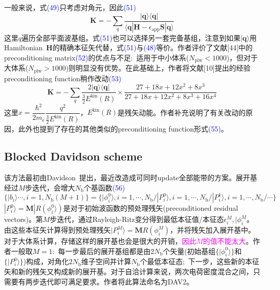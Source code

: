 \documentclass[14pt]{article}      %
\begin{document}
一般来说，式\textcolor{blue}{(49)}只考虑对角元，因此\textcolor{blue}{(51)}
\begin{displaymath}
	\mathbf{K}=-\sum_q\dfrac{|\mathbf{q}\rangle\langle\mathbf{q}|}{\langle\mathbf{q}|\mathbf{H}-\epsilon_{\mathrm{app}}\mathbf{S}|\mathbf{q}\rangle}
\end{displaymath}
这里$q$遍历全部平面波基组。式\textcolor{blue}{(51)}也可以选择另一套完备基组，注意到如果$|\mathbf{q}\rangle$用\textrm{Hamiltonian~}$\mathbf{H}$的精确本征矢代替，式\textcolor{blue}{(51)}与\textcolor{blue}{(48)}等价。作者评价了文献[44]中的\textrm{preconditioning matrix}\textcolor{blue}{(52)}的优点与不足:~适用于中小体系($N_{\mathrm{plw}}<1000$)，但对于大体系($N_{\mathrm{plw}}>1000$)则明显没有优势。在此基础上，作者将文献[10]提出的经验\textrm{preconditioning function}稍作改动\textcolor{blue}{(53)}
\begin{displaymath}
	\mathbf{K}=-\sum_q\dfrac{2|\mathbf{q}\rangle\langle\mathbf{q}|}{\frac32E^{\mathrm{kin}}(R)}\times\dfrac{27+18x+12x^2+8x^3}{27+18x+12x^2+8x^3+16x^4}
\end{displaymath}
这里$x=\dfrac{\hbar^2}{2m_{\mathrm{e}}}\dfrac{q^2}{\frac32E^{\mathrm{kin}}(R)}$，$E^{\mathrm{kin}}(R)$是残矢动能。作者补充说明了有关改动的原因，此外也提到了存在的其他类似的\textrm{preconditioning function}形式\textcolor{blue}{(55)}。

\subsection{Blocked Davidson scheme}
该方法最初由\textrm{Davidson~}提出，最近改造成可同时\textrm{update}全部能带的方案。展开基经过$M$步迭代，会增大$N_{\mathrm{b}}$个基函数\textcolor{blue}{(56)}
\begin{displaymath}
	\{|b_i\rangle\cdots,i=1,N_{\mathrm{b}}(M+1)\}=\{|\phi_i^0\rangle,i=1,\cdots,N_{\mathrm{b}}/|P_i^0\rangle,i=1,\cdots,N_{\mathrm{b}}/|P_i^1\rangle,i=1,\cdots,N_{\mathrm{b}}/\cdots\}
\end{displaymath}
$|P_i^0\rangle=\mathbf{M}|R(\phi_i^0\rangle)$是对于初始波函数的预处理残矢(\textrm{preconditioned residual vectors})。第$M$步迭代，通过\textrm{Rayleigh-Ritz}变分得到最低本征值/本征态$\epsilon_i^M,|\phi_i^M$。由这些本征矢计算得到预处理残矢$|P_i^M\rangle=\mathbf{M}R(\phi_i^M)$，并将残矢加入展开基中。对于大体系计算，存储这样的展开基也会是很大的开销，\textcolor{magenta}{因此$M$的值不能太大}。作者一般取$M=1$:~每一步最后的展开基组都是由2$N_{\mathrm{b}}$个矢量(初始基组$\{|\phi_i^0\rangle\}$和$\{|P_i^0\rangle\}$)构成，对角化$2N_{\mathrm{b}}$维子空间并计算$N_{\mathrm{b}}$个最低本征态;~下一步，这些新的本征矢和新的残矢又构成新的展开基。对于自洽计算来说，两次电荷密度混合之间，只需要有两步迭代即可满足要求。作者将此算法命名为\textrm{DAV2}。
\end{document}
